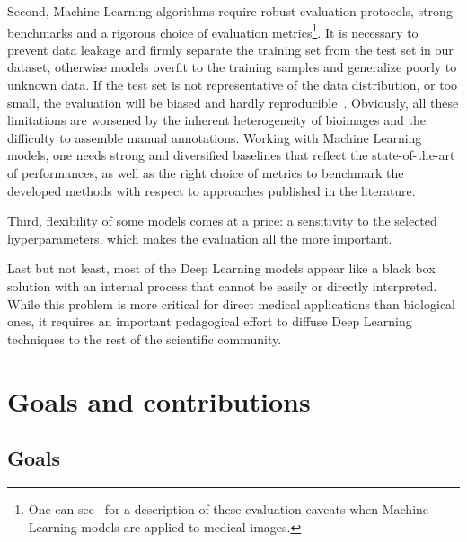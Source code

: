 Second, Machine Learning algorithms require robust evaluation protocols, strong benchmarks and a rigorous choice of evaluation metrics\footnote{One can see~\cite{varoquaux_machine_2022} for a description of these evaluation caveats when Machine Learning models are applied to medical images.}.
It is necessary to prevent data leakage and firmly separate the training set from the test set in our dataset, otherwise models overfit to the training samples and generalize poorly to unknown data.
If the test set is not representative of the data distribution, or too small, the evaluation will be biased and hardly reproducible~\cite{Varoquaux_cv_2018}.
Obviously, all these limitations are worsened by the inherent heterogeneity of bioimages and the difficulty to assemble manual annotations.
Working with Machine Learning models, one needs strong and diversified baselines that reflect the state-of-the-art of performances, as well as the right choice of metrics to benchmark the developed methods with respect to approaches published in the literature.

Third, flexibility of some models comes at a price: a sensitivity to the selected hyperparameters, which makes the evaluation all the more important.

Last but not least, most of the Deep Learning models appear like a black box solution with an internal process that cannot be easily or directly interpreted.
While this problem is more critical for direct medical applications than biological ones, it requires an important pedagogical effort to diffuse Deep Learning techniques to the rest of the scientific community.

\section{Goals and contributions}
\label{sec:contributions}

\subsection{Goals}
\label{subsec:intro_goals}

